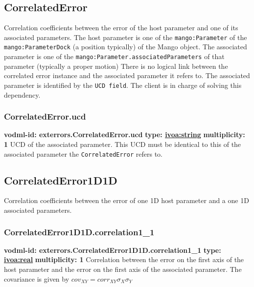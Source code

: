   \subsection{CorrelatedError}
  \label{sect:exterrors.CorrelatedError}
    Correlation coefficients between the error of the host parameter and one of its associated parameters. The host parameter is one of the \texttt{mango:Parameter} of the \texttt{mango:ParameterDock} (a position typically) of the Mango object. The associated parameter is one of the \texttt{mango:Parameter.associatedParameters} of that parameter (typically a proper motion) There is no logical link between the correlated error instance and the associated parameter it refers to. The associated parameter is identified by the \texttt{UCD field}. The client is in charge of solving this dependency.

    \subsubsection{CorrelatedError.ucd}
      \textbf{vodml-id: exterrors.CorrelatedError.ucd} \newline
      \textbf{type: \hyperref[sect:ivoa]{ivoa:string}} \newline
      \textbf{multiplicity: 1} \newline 
      UCD of the associated parameter. This UCD must be identical to this of the associated parameter the \texttt{CorrelatedError} refers to.

  \subsection{CorrelatedError1D1D}
  \label{sect:exterrors.CorrelatedError1D1D}
    Correlation coefficients between the error of one 1D host parameter and a one 1D associated parameters.

    \subsubsection{CorrelatedError1D1D.correlation1\_1}
      \textbf{vodml-id: exterrors.CorrelatedError1D1D.correlation1\_1} \newline
      \textbf{type: \hyperref[sect:ivoa]{ivoa:real}} \newline
      \textbf{multiplicity: 1} \newline 
      Correlation between the error on the first axis of the host parameter and the error on the first axis of the associated parameter. The covariance is given by $cov_{XY}=corr_{XY}\sigma_{X}\sigma_{Y}$

